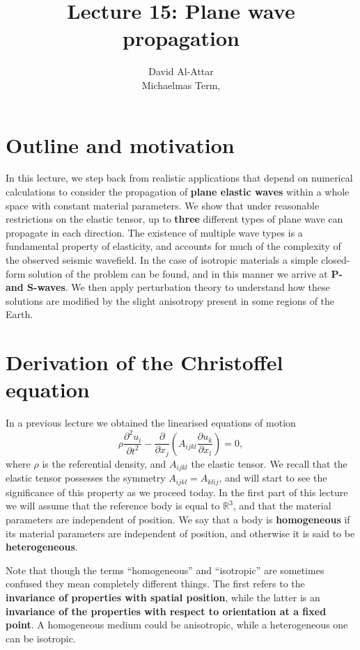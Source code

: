 \documentclass [a4paper,12pt]{paper}
\title{Lecture 15: Plane wave propagation}
\author{David Al-Attar \\ Michaelmas Term, \the\year}
\begin{document}
\maketitle

\section*{Outline and motivation}

In this lecture, we step back from realistic applications that depend on numerical calculations to consider the 
propagation of \textbf{plane elastic waves}  within a whole space with constant material parameters.
We show that under reasonable restrictions on the elastic tensor, up to \textbf{three} different types of plane 
wave can propagate in each direction. The existence of multiple wave types is a fundamental property of
elasticity, and accounts for much of the complexity of the observed seismic wavefield. In the case of isotropic 
materials a simple closed-form solution of the problem can be found, and in this manner we 
arrive at \textbf{P- and S-waves}. We then apply perturbation theory to understand how these solutions are modified by 
the slight anisotropy present in some regions of the Earth.

\section*{Derivation of the Christoffel equation}

In a previous lecture we obtained the linearised equations of motion
\begin{equation}
\rho\frac{\partial^{2}u_{i}}{\partial t^{2}}-\frac{\partial}{\partial x_{j}}\left(A_{ijkl}\frac{\partial u_{k}}{\partial x_{l}}\right)=0,
\end{equation}
where $\rho$ is the referential density, and $A_{ijkl}$ the elastic tensor. We recall that the elastic tensor possesses the symmetry $A_{ijkl}=A_{klij}$, and will start to see the significance of this property as we proceed today. 
In the first part of this lecture we will assume that the reference body is equal to $\mathbb{R}^{3}$, and that the material parameters are independent of position. We say that a body is \textbf{homogeneous} if its material parameters 
are independent of position, and otherwise it is said to be \textbf{heterogeneous}.

Note that though the terms ``homogeneous'' and ``isotropic'' are sometimes confused they mean completely different things. The first refers to the 
\textbf{invariance of properties with spatial position}, while the latter is an \textbf{invariance of the
 properties with respect to orientation at a fixed point}. 
A homogeneous medium could be anisotropic, while a heterogeneous one can be isotropic.
\end{document}
